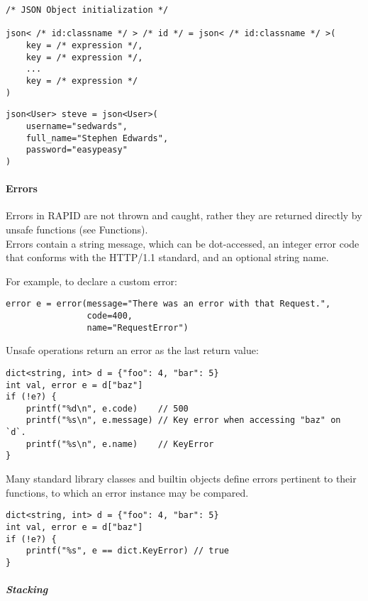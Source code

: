 \documentclass[]{article}
\begin{document}
\begin{verbatim}
/* JSON Object initialization */

json< /* id:classname */ > /* id */ = json< /* id:classname */ >(
    key = /* expression */,
    key = /* expression */,
    ...
    key = /* expression */
)
\end{verbatim}

\begin{verbatim}
json<User> steve = json<User>(
    username="sedwards",
    full_name="Stephen Edwards",
    password="easypeasy"
)
\end{verbatim}

\paragraph{Errors}\label{errors}

Errors in RAPID are not thrown and caught, rather they are returned
directly by unsafe functions (see Functions).\\Errors contain a string
message, which can be dot-accessed, an integer error code that conforms
with the HTTP/1.1 standard, and an optional string name.

For example, to declare a custom error:

\begin{verbatim}
error e = error(message="There was an error with that Request.",
                code=400,
                name="RequestError")
\end{verbatim}

Unsafe operations return an error as the last return value:

\begin{verbatim}
dict<string, int> d = {"foo": 4, "bar": 5}
int val, error e = d["baz"]
if (!e?) {
    printf("%d\n", e.code)    // 500
    printf("%s\n", e.message) // Key error when accessing "baz" on `d`.
    printf("%s\n", e.name)    // KeyError
}
\end{verbatim}

Many standard library classes and builtin objects define errors
pertinent to their functions, to which an error instance may be
compared.

\begin{verbatim}
dict<string, int> d = {"foo": 4, "bar": 5}
int val, error e = d["baz"]
if (!e?) {
    printf("%s", e == dict.KeyError) // true
}
\end{verbatim}

\subparagraph{Stacking}\label{stacking}
\end{document}
